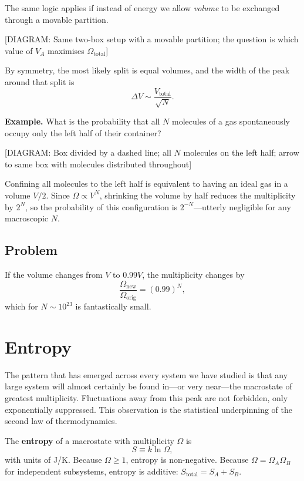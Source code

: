 The same logic applies if instead of energy we allow \emph{volume} to be exchanged through a
movable partition.

\begin{center}
[DIAGRAM: Same two-box setup with a movable partition; the question is which value of $V_A$
maximises $\Omega_{\text{total}}$]
\end{center}

By symmetry, the most likely split is equal volumes, and the width of the peak around that split is
\[
  \Delta V \sim \frac{V_{\text{total}}}{\sqrt{N}}.
\]

\textbf{Example.} What is the probability that all $N$ molecules of a gas spontaneously occupy
only the left half of their container?

\begin{center}
[DIAGRAM: Box divided by a dashed line; all $N$ molecules on the left half; arrow to same box with
molecules distributed throughout]
\end{center}

Confining all molecules to the left half is equivalent to having an ideal gas in a volume $V/2$.
Since $\Omega \propto V^N$, shrinking the volume by half reduces the multiplicity by $2^N$, so the
probability of this configuration is $2^{-N}$—utterly negligible for any macroscopic $N$.

\subsection*{Problem}

If the volume changes from $V$ to $0.99V$, the multiplicity changes by
\[
  \frac{\Omega_{\text{new}}}{\Omega_{\text{orig}}} = (0.99)^N,
\]
which for $N \sim 10^{23}$ is fantastically small.


\section{Entropy}

The pattern that has emerged across every system we have studied is that any large system will
almost certainly be found in—or very near—the macrostate of greatest multiplicity. Fluctuations
away from this peak are not forbidden, only exponentially suppressed. This observation is the
statistical underpinning of the second law of thermodynamics.

\begin{definition}
The \textbf{entropy} of a macrostate with multiplicity $\Omega$ is
\[
  S \equiv k\ln\Omega,
\]
with units of J/K. Because $\Omega \geq 1$, entropy is non-negative. Because $\Omega =
\Omega_A\Omega_B$ for independent subsystems, entropy is additive: $S_{\text{total}} = S_A + S_B$.
\end{definition}

